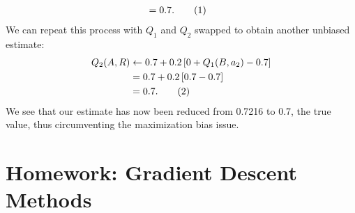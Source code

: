 \documentclass{article}
\newcommand\numberthis{\addtocounter{equation}{1}\tag{\theequation}}
\begin{document}
\begin{enumerate}
\begin{align*}
		                & = 0.7. \numberthis
	      \end{align*}
	      We can repeat this process with $Q_1$ and $Q_2$ swapped to obtain another unbiased estimate:
	      \begin{align*}
		      Q_2(A, R) & \leftarrow 0.7 + 0.2 \left[ 0 + Q_1(B, a_2) - 0.7\right] \\
		                & = 0.7 + 0.2 \left[ 0.7 - 0.7\right]                      \\
		                & = 0.7. \numberthis
	      \end{align*}
	      We see that our estimate has now been reduced from 0.7216 to 0.7, the true value, thus
	      circumventing the maximization bias issue.
\end{enumerate}

\section*{Homework: Gradient Descent Methods}
\end{document}
